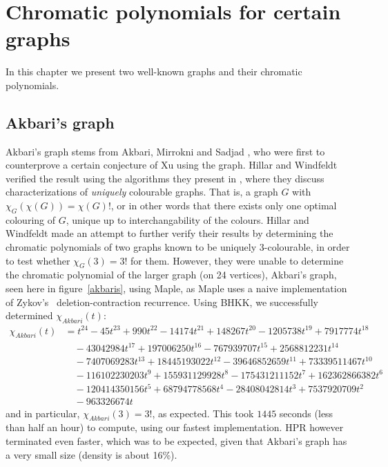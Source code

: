 \documentclass{cslthse-msc}
\begin{document}
\chapter{Chromatic polynomials for certain graphs}
In this chapter we present two well-known graphs and their chromatic polynomials.

\section{Akbari's graph}
Akbari's graph stems from Akbari, Mirrokni and Sadjad \cite{akbari}, who were first to counterprove a certain conjecture of Xu using the graph. Hillar and Windfeldt verified the result using the algorithms they present in \cite{hillar_windfeldt}, where they discuss characterizations of \emph{uniquely} colourable graphs. That is, a graph $G$ with $\chi_G(\chi(G)) = \chi(G)!$, or in other words that there exists only one optimal colouring of $G$, unique up to interchangability of the colours. 
Hillar and Windfeldt made an attempt to further verify their results by determining the chromatic polynomials of two graphs known to be uniquely 3-colourable, in order to test whether $\chi_G(3) = 3!$ for them. However, they were unable to determine the chromatic polynomial of the larger graph (on 24 vertices), Akbari's graph, seen here in figure~\ref{akbaris}, using Maple, as Maple uses a naive implementation of Zykov's~\cite{aazykov} deletion-contraction recurrence.  Using BHKK, we successfully determined $\chi_{Akbari}(t)$:
\begin{equation*}
\begin{split}
\chi_{Akbari}(t) & =  t^{24} - 45t^{23} + 990t^{22} -14174t^{21} + 148267t^{20} - 1205738t^{19} + 7917774t^{18} \\ 
& \quad - 43042984t^{17} + 197006250t^{16} - 767939707t^{15} + 2568812231t^{14} \\ & \quad - 7407069283t^{13} 
+ 18445193022t^{12} - 39646852659t^{11} + 73339511467t^{10} \\ & \quad - 116102230203t^9 
+ 155931129928t^8 - 175431211152t^7 + 162362866382t^6 \\ & \quad - 120414350156t^5 
+ 68794778568t^4 - 28408042814t^3 + 7537920709t^2 \\ & \quad - 963326674t
\end{split}
\end{equation*}
and in particular, $\chi_{Akbari}(3) = 3!$, as expected. This took $1445$ seconds (less than half an hour) to compute, using our fastest implementation. HPR however terminated even faster, which was to be expected, given that Akbari's graph has a very small size (density is about 16\%).
\end{document}
